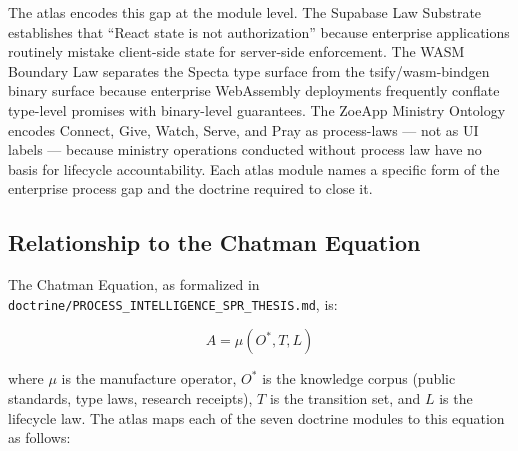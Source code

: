 The atlas encodes this gap at the module level. The Supabase Law Substrate
establishes that ``React state is not authorization'' because enterprise
applications routinely mistake client-side state for server-side enforcement.
The WASM Boundary Law separates the Specta type surface from the
tsify/wasm-bindgen binary surface because enterprise WebAssembly deployments
frequently conflate type-level promises with binary-level guarantees. The ZoeApp
Ministry Ontology encodes Connect, Give, Watch, Serve, and Pray as process-laws
--- not as UI labels --- because ministry operations conducted without process
law have no basis for lifecycle accountability. Each atlas module names a
specific form of the enterprise process gap and the doctrine required to close
it.

\subsection{Relationship to the Chatman Equation}
\label{sec:atlas-lineage-chatman}

The Chatman Equation, as formalized in
\texttt{doctrine/PROCESS\_INTELLIGENCE\_SPR\_THESIS.md}, is:

\[
  A = \mu(O^*, T, L)
\]

where $\mu$ is the manufacture operator, $O^*$ is the knowledge corpus
(public standards, type laws, research receipts), $T$ is the transition set, and
$L$ is the lifecycle law. The atlas maps each of the seven doctrine modules to
this equation as follows:

